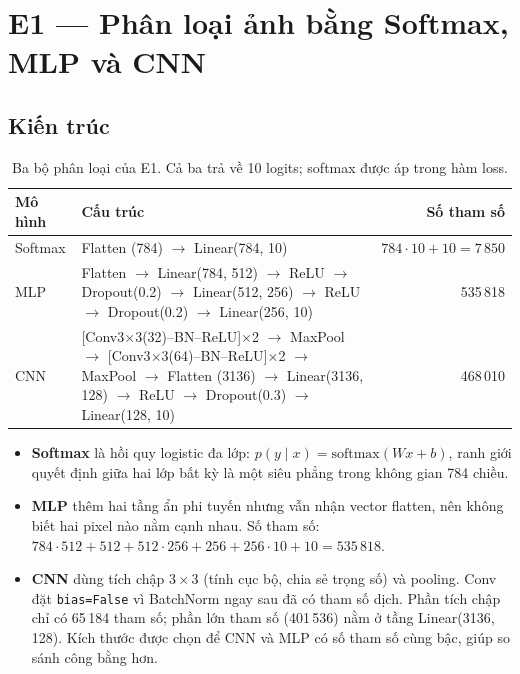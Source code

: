 \documentclass[twoside,final]{hcmut-report}
\begin{document}
\section{E1 — Phân loại ảnh bằng Softmax, MLP và CNN}

\subsection{Kiến trúc}
\begin{table}[H]
\centering
\small
\begin{tabular}{lp{8.2cm}r}
\toprule
Mô hình & Cấu trúc & Số tham số \\
\midrule
Softmax & Flatten (784) $\rightarrow$ Linear(784, 10) & $784\cdot10+10 = 7\,850$ \\
MLP & Flatten $\rightarrow$ Linear(784, 512) $\rightarrow$ ReLU $\rightarrow$ Dropout(0.2) $\rightarrow$
      Linear(512, 256) $\rightarrow$ ReLU $\rightarrow$ Dropout(0.2) $\rightarrow$ Linear(256, 10) & 535\,818 \\
CNN & [Conv3$\times$3(32)–BN–ReLU]$\times$2 $\rightarrow$ MaxPool $\rightarrow$
      [Conv3$\times$3(64)–BN–ReLU]$\times$2 $\rightarrow$ MaxPool $\rightarrow$ Flatten (3136)
      $\rightarrow$ Linear(3136, 128) $\rightarrow$ ReLU $\rightarrow$ Dropout(0.3) $\rightarrow$ Linear(128, 10) & 468\,010 \\
\bottomrule
\end{tabular}
\caption{Ba bộ phân loại của E1. Cả ba trả về 10 logits; softmax được áp trong hàm loss.}
\end{table}

\begin{itemize}
  \item \textbf{Softmax} là hồi quy logistic đa lớp: $p(y\mid x)=\mathrm{softmax}(Wx+b)$, ranh giới quyết định giữa hai lớp bất kỳ là một siêu phẳng trong không gian 784 chiều.
  \item \textbf{MLP} thêm hai tầng ẩn phi tuyến nhưng vẫn nhận vector flatten, nên không biết hai pixel nào nằm cạnh nhau. Số tham số: $784\cdot512+512 + 512\cdot256+256 + 256\cdot10+10 = 535\,818$.
  \item \textbf{CNN} dùng tích chập $3\times3$ (tính cục bộ, chia sẻ trọng số) và pooling. Conv đặt
        \texttt{bias=False} vì BatchNorm ngay sau đã có tham số dịch. Phần tích chập chỉ có 65\,184 tham số; phần lớn tham số (401\,536) nằm ở tầng Linear(3136, 128). Kích thước được chọn để CNN và MLP có số tham số cùng bậc, giúp so sánh công bằng hơn.
\end{itemize}
\end{document}
